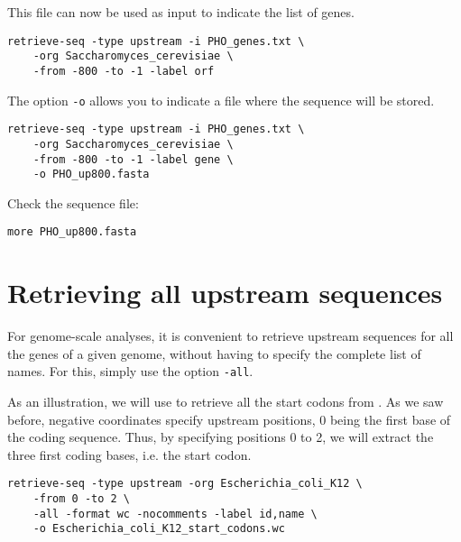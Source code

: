 This file can now be used as input to indicate the list of genes.

{\color{blue} \begin{footnotesize}
\begin{verbatim}
retrieve-seq -type upstream -i PHO_genes.txt \
    -org Saccharomyces_cerevisiae \
    -from -800 -to -1 -label orf
\end{verbatim}\end{footnotesize}} 

The option \texttt{-o} allows you to indicate a file where the
sequence will be stored.

{\color{blue} \begin{footnotesize}
\begin{verbatim}
retrieve-seq -type upstream -i PHO_genes.txt \
    -org Saccharomyces_cerevisiae \
    -from -800 -to -1 -label gene \
    -o PHO_up800.fasta
\end{verbatim}\end{footnotesize}} 

Check the sequence file:

{\color{blue} \begin{footnotesize}
\begin{verbatim}
more PHO_up800.fasta
\end{verbatim}\end{footnotesize}}

\section{Retrieving all upstream sequences}

For genome-scale analyses, it is convenient to retrieve upstream
sequences for all the genes of a given genome, without having to
specify the complete list of names. For this, simply use the option
\texttt{-all}.

As an illustration, we will use \command{retrieve-seq} to retrieve all
the start codons from \organism{Escherichia coli}. As we saw before,
negative coordinates specify upstream positions, 0 being the first
base of the coding sequence. Thus, by specifying positions 0 to 2, we
will extract the three first coding bases, i.e. the start codon. 

{\color{blue} \begin{footnotesize}
\begin{verbatim}
retrieve-seq -type upstream -org Escherichia_coli_K12 \
    -from 0 -to 2 \
    -all -format wc -nocomments -label id,name \
    -o Escherichia_coli_K12_start_codons.wc
\end{verbatim}\end{footnotesize}}


